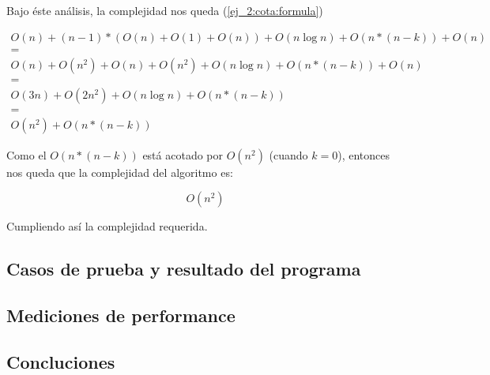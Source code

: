 Bajo \'este an\'alisis, la complejidad nos queda (\ref{ej_2:cota:formula})

\begin{equation}
\label{ej_2:cota:formula}
\begin{split}
	O(n) + (n-1)*(O(n) + O(1) + O(n)) + O(n \log n) + O(n*(n - k)) + O(n) \\
= \\
O(n) + O(n^2) + O(n) + O(n^2) + O(n \log n) + O(n*(n - k)) + O(n)\\
= \\
O(3n) + O(2n^2) + O(n \log n) + O(n*(n - k))\\
= \\
O(n^2) + O(n*(n - k))
\end{split}
\end{equation}

Como el $O(n*(n - k))$ est\'a acotado por $O(n^2)$ (cuando $k = 0$), entonces nos queda que la complejidad del algoritmo es:

\begin{equation*}
	O(n^2)
\end{equation*}

Cumpliendo as\'i la complejidad requerida.

\subsection{Casos de prueba y resultado del programa} \label{ej_2:casos}

\subsection{Mediciones de performance} \label{ej_2:performance}

\subsection{Concluciones} \label{ej_2:concluciones}

